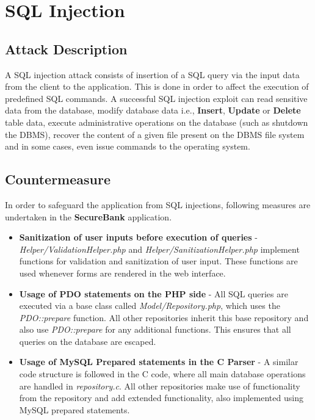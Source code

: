 \section{SQL Injection}

\subsection{Attack Description}
A SQL injection attack consists of insertion of a SQL query via the input data from the client to the application. This is done in order to affect the execution of predefined SQL commands.
A successful SQL injection exploit can read sensitive data from the database, modify database data i.e., \textbf{Insert}, \textbf{Update} or \textbf{Delete} table data, execute administrative operations on the database (such as shutdown the DBMS), recover the content of a given file present on the DBMS file system and in some cases, even issue commands to the operating system.

\subsection{Countermeasure}
In order to safeguard the application from SQL injections, following measures are undertaken in the \textbf{SecureBank} application.
\begin{itemize}
\item \textbf{Sanitization of user inputs before execution of queries} -  \textit{Helper/ValidationHelper.php} and \textit{Helper/SanitizationHelper.php} implement functions for validation and sanitization of user input. These functions are used whenever forms are rendered in the web interface.
\item \textbf{Usage of PDO statements on the PHP side} - All SQL queries are executed via a base class called \textit{Model/Repository.php}, which uses the \textit{PDO::prepare} function. All other repositories inherit this base repository and also use \textit{PDO::prepare} for any additional functions. This ensures that all queries on the database are escaped.
\item \textbf{Usage of MySQL Prepared statements in the C Parser} - A similar code structure is followed in the C code, where all main database operations are handled in \textit{repository.c}. All other repositories make use of functionality from the repository and add extended functionality, also implemented using MySQL prepared statements. 
\end{itemize}

\clearpage